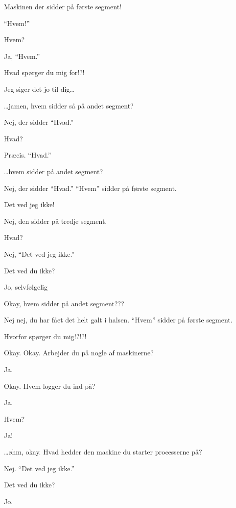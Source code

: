 \documentclass[10pt]{article}
\begin{document}
\begin{sketch}
 Maskinen der sidder på første segment!

 ``Hvem!''

 Hvem?

 Ja, ``Hvem.''

 Hvad spørger du mig for!?!

 Jeg siger det jo til dig\ldots{}


 \ldots{}jamen, hvem sidder så på andet segment?

 Nej, der sidder ``Hvad.''

 Hvad?

 Præcis. ``Hvad.''

 \ldots{}hvem sidder på andet segment?

 Nej, der sidder ``Hvad.'' ``Hvem'' sidder på første segment.

 Det ved jeg ikke!

 Nej, den sidder på tredje segment.

 Hvad?

 Nej, ``Det ved jeg ikke.''

 Det ved du ikke?

 Jo, selvfølgelig

 Okay, hvem sidder på andet segment???

 Nej nej, du har fået det helt galt i halsen. ``Hvem'' sidder på første segment.

 Hvorfor spørger du mig!?!?!


 Okay. Okay. Arbejder du på nogle af maskinerne?

 Ja.

 Okay. Hvem logger du ind på?

 Ja.

 Hvem?

 Ja!

 \ldots{}øhm, okay. Hvad hedder den maskine du starter processerne på?

 Nej. ``Det ved jeg ikke.''

 Det ved du ikke?

 Jo.


\end{sketch}
\end{document}

